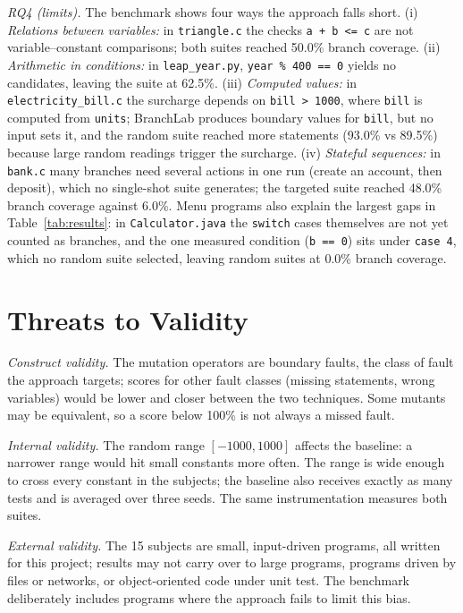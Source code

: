 \documentclass[conference]{IEEEtran}
\begin{document}
\textit{RQ4 (limits).} The benchmark shows four ways the approach falls short. (i) \emph{Relations between
variables:} in \texttt{triangle.c} the checks \texttt{a + b <= c} are not variable--constant comparisons; both
suites reached 50.0\% branch coverage. (ii) \emph{Arithmetic in conditions:} in \texttt{leap\_year.py},
\texttt{year \% 400 == 0} yields no candidates, leaving the suite at 62.5\%. (iii) \emph{Computed values:} in
\texttt{electricity\_bill.c} the surcharge depends on \texttt{bill > 1000}, where \texttt{bill} is computed from
\texttt{units}; BranchLab produces boundary values for \texttt{bill}, but no input sets it, and the random suite
reached more statements (93.0\% vs 89.5\%) because large random readings trigger the surcharge.
(iv) \emph{Stateful sequences:} in \texttt{bank.c} many branches need several actions in one run (create an
account, then deposit), which no single-shot suite generates; the targeted suite reached 48.0\% branch
coverage against 6.0\%. Menu programs also explain the largest gaps in Table~\ref{tab:results}: in
\texttt{Calculator.java} the \texttt{switch} cases themselves are not yet counted as branches, and the one
measured condition (\texttt{b == 0}) sits under \texttt{case 4}, which no random suite selected, leaving random
suites at 0.0\% branch coverage.

\section{Threats to Validity}\label{sec:threats}
\textit{Construct validity.} The mutation operators are boundary faults, the class of fault the approach
targets; scores for other fault classes (missing statements, wrong variables) would be lower and closer between
the two techniques. Some mutants may be equivalent, so a score below 100\% is not always a missed fault.

\textit{Internal validity.} The random range $[-1000, 1000]$ affects the baseline: a narrower range would hit
small constants more often. The range is wide enough to cross every constant in the subjects; the baseline also
receives exactly as many tests and is averaged over three seeds. The same instrumentation measures both suites.

\textit{External validity.} The 15 subjects are small, input-driven programs, all written for this project;
results may not carry over to large programs, programs driven by files or networks, or object-oriented code
under unit test. The benchmark deliberately includes programs where the approach fails to limit this bias.
\end{document}
